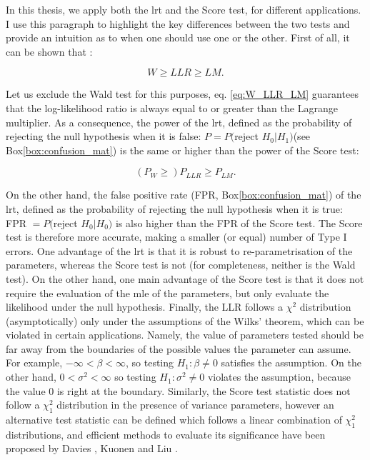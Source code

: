 In this thesis, we apply both the \gls{lrt} and the Score test, for different applications.
I use this paragraph to highlight the key differences between the two tests and provide an intuition as to when one should use one or the other.
First of all, it can be shown that \cite{engle1984wald}:

\begin{equation}\label{eq:W_LLR_LM}
    W \geq LLR \geq LM.
\end{equation}

Let us exclude the Wald test for this purposes, eq. \eqref{eq:W_LLR_LM} guarantees that the log-likelihood ratio is always equal to or greater than the Lagrange multiplier.
As a consequence, the power  of the \gls{lrt}, defined as the probability of rejecting the null hypothesis when it is false: $P = P($reject $H_0 | H_1)$(see Box\ref{box:confusion_mat}) is the same or higher than the power of the Score test:

\begin{equation}
    (P_W \geq) P_{LLR} \geq P_{LM}.
\end{equation}

On the other hand, the false positive rate (FPR, Box\ref{box:confusion_mat}) of the \gls{lrt}, defined as the probability of rejecting the null hypothesis when it is true: FPR $= P($reject $H_0 | H_0)$ is also higher than the FPR of the Score test.
The Score test is therefore more accurate, making a smaller (or equal) number of Type I errors. 
One advantage of the \gls{lrt} is that it is robust to re-parametrisation of the parameters, whereas the Score test is not (for completeness, neither is the Wald test). 
On the other hand, one main advantage of the Score test is that it does not require the evaluation of the \gls{mle} of the parameters, but only evaluate the likelihood under the null hypothesis.
Finally, the LLR follows a $\chi^2$ distribution (asymptotically) only under the assumptions of the Wilks' theorem, which can be violated in certain applications.
Namely, the value of parameters tested should be far away from the boundaries of the possible values the parameter can assume.
For example, $-\infty < \beta < \infty$, so testing $H_1: \beta \neq 0$ satisfies the assumption.
On the other hand, $0 < \sigma^2 < \infty$ so testing $H_1: \sigma^2 \neq 0$ violates the assumption, because the value $0$ is right at the boundary.
Similarly, the Score test statistic does not follow a $\chi^2_1$ distribution in the presence of variance parameters, however an alternative test statistic can be defined which follows a linear combination of $\chi^2_1$ distributions, and efficient methods to evaluate its significance have been proposed by Davies \cite{davies1980algorithm}, Kuonen \cite{kuonen1999miscellanea} and Liu \cite{liu2009new, lee2012optimal}. \\

